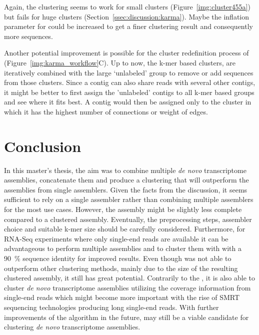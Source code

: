 \documentclass[12pt,a4paper,english]{article}
\begin{document}
	Again, the \mcl clustering seems to work for small clusters (Figure~\ref{img:cluster455a}) but fails for huge clusters (Section~\ref{ssec:discussion:karma}). Maybe the inflation parameter for \mcl could be increased to get a finer clustering result and consequently more sequences.
	
	Another potential improvement is possible for the cluster redefinition process of \karma (Figure~\ref{img:karma_workflow}C). Up to now, the k-mer based clusters, are iteratively combined with the large `unlabeled' group to remove or add sequences from those clusters. 
	Since a contig can also share reads with several other contigs, it might be better to first assign the 'unlabeled' contigs to all k-mer based groups and see where it fits best. A contig would then be assigned only to the cluster in which it has the highest number of connections or weight of edges.
	\newpage
	\section{Conclusion}
		In this master's thesis, the aim was to combine multiple \textit{de novo} transcriptome assemblies, concatenate them and produce a clustering that will outperform the assemblies from single assemblers.
		Given the facts from the discussion, it seems sufficient to rely on a single assembler rather than combining multiple assemblers for the most use cases. 
		However, the assembly might be slightly less complete compared to a clustered assembly.
		Eventually, the preprocessing steps, assembler choice and suitable k-mer size should be carefully considered.
		Furthermore, for RNA-Seq experiments where only single-end reads are available it can be advantageous to perform multiple assemblies and to cluster them with \cdhit with a 90~\% sequence identity for improved results.
		Even though \karma was not able to outperform other clustering methods, mainly due to the size of the resulting clustered assembly, it still has great potential. 
		Contrarily to the \orp, it is also able to cluster \textit{de novo} transcriptome assemblies utilizing the coverage information from single-end reads which might become more important with the rise of SMRT sequencing technologies producing long single-end reads.
		With further improvements of the algorithm in the future, \karma may still be a viable candidate for clustering \textit{de novo} transcriptome assemblies.
	
	
	

\newpage
\pagestyle{fancy}
\end{document}
